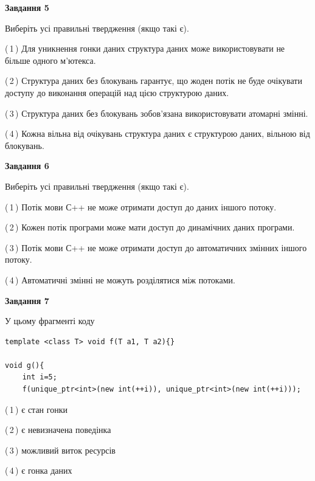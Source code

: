 \documentclass[12pt, ukrainian]{article}
\begin{document}
\begin {large}
{\begin{center}
\textbf{Завдання 5}
\end{center}

Виберіть усі правильні твердження (якщо такі є).\par
\vspace{2mm}

(\,1\,) Для уникнення гонки даних структура даних може використовувати не більше одного м’ютекса.%

(\,2\,) Структура даних без блокувань гарантує, що жоден потік не буде очікувати доступу до виконання операцій над цією структурою даних.%

(\,3\,) Структура даних без блокувань зобов’язана використовувати атомарні змінні.%

(\,4\,) Кожна вільна від очікувань структура даних є структурою даних, вільною від блокувань.%
\newpage


\begin{center}
\textbf{Завдання 6}
\end{center}

Виберіть усі правильні твердження (якщо такі є).\par
\vspace{2mm}

(\,1\,) Потік мови С++ не може отримати доступ до даних іншого потоку.%

(\,2\,) Кожен потік програми може мати доступ до динамічних даних програми.%

(\,3\,) Потік мови С++ не може отримати доступ до автоматичних змінних іншого потоку.%

(\,4\,) Автоматичні змінні не можуть розділятися між потоками.%


\begin{center}
\textbf{Завдання 7}
\end{center}

У цьому фрагменті коду
\begin{verbatim}
template <class T> void f(T a1, T a2){}

void g(){
    int i=5;
    f(unique_ptr<int>(new int(++i)), unique_ptr<int>(new int(++i)));
\end{verbatim}

(\,1\,) є стан гонки%

(\,2\,) є невизначена поведінка%

(\,3\,) можливий виток ресурсів%

(\,4\,) є гонка даних%

}
\end {large}

\vspace{4mm}
\newpage
\end{document}
